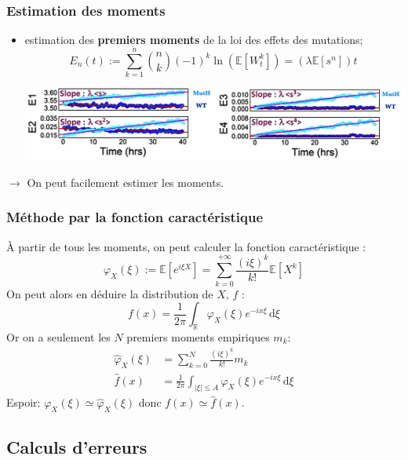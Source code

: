 \documentclass{beamer}
\newcommand{\pth}[1]{\left(#1\right)}
\newcommand{\cro}[1]{\left[#1\right]}
\newcommand{\abs}[1]{\left|#1\right|}
\newcommand{\de}{\,\text{d}}
\newcommand{\Esp}[1]{\mathbb{E}\cro{#1}}
\begin{document}
\begin{frame}
  \frametitle{Estimation des moments}
\begin{itemize}[label=$\bullet$]
  \item estimation des \textbf{premiers moments} de la loi des effets des mutations;
 \[E_n(t):=\sum_{k=1}^n\binom{n}{k}(-1)^k\ln\pth{\Esp{W_t^k}}=\pth{\lambda\Esp{s^n}}t\]
 \pause
 \begin{centering}
    \vspace{3mm}
    \includegraphics[scale=0.55]{img/Moments_estimation.png}
  \end{centering}
  \end{itemize}
$\to$ On peut facilement estimer les moments.
\end{frame}


\begin{frame}
  \frametitle{Méthode par la fonction caractéristique}
  À partir de tous les moments, on peut calculer la fonction caractéristique : 
  \[\varphi_X(\xi):=\Esp{e^{i\xi X}}=\sum_{k=0}^{+\infty}\frac{(i\xi)^k}{k!}\Esp{X^k}\]
  \pause
  On peut alors en déduire la distribution de $X$, $f$ :
  \[f(x) = \frac1{2\pi} \int_{\mathbb R}\varphi_X(\xi)e^{-ix\xi}\de\xi\]
  \pause
  Or on a seulement les $N$ premiers moments empiriques $m_k$:
  \begin{align*}
    \hat{\varphi}_X(\xi)&=\sum_{k=0}^{N}\frac{(i\xi)^k}{k!}m_k\\
    \hat{f}(x)&= \frac1{2\pi} \int_{\abs{\xi}\leqslant A}\hat\varphi_X(\xi)e^{-ix\xi}\de\xi
  \end{align*}
  Espoir: $\varphi_X(\xi)\simeq \hat{\varphi}_X(\xi)$ donc $f(x)\simeq\hat{f}(x)$.

\end{frame}


\subsection{Calculs d'erreurs}
\end{document}
